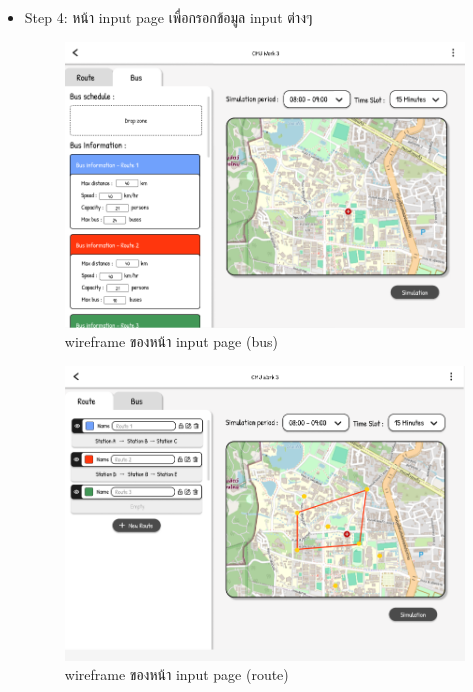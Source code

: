 \begin{mypara}
\begin{itemize}
    \item Step 4: หน้า input page เพื่อกรอกข้อมูล input ต่างๆ
      \begin{figure}[H]
        \centering
        \includegraphics[scale=0.4]{input_bus.png}
        \caption{wireframe ของหน้า input page (bus) }
        \label{fig:WireframeInputGuest}
      \end{figure}
      \begin{figure}[H]
        \centering
        \includegraphics[scale=0.4]{input_route.png}
        \caption{wireframe ของหน้า input page (route) }
        \label{fig:WireframeInputRouteGuest}
      \end{figure}


\end{itemize}
\end{mypara}
